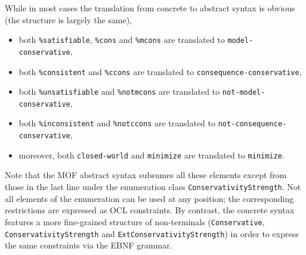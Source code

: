 \documentclass[10pt, a4paper]{isov2}
\newcommand*{\syntax}[1]{\texttt{#1}}
\begin{document}
While in most cases the translation from concrete to abstract syntax
is obvious (the structure is largely the same),  
\begin{itemize}
\item both \syntax{\%satisfiable}, \syntax{\%cons} and \syntax{\%mcons} are translated
  to \syntax{model-conservative},
\item both \syntax{\%consistent}  and \syntax{\%ccons} are translated
  to \syntax{consequence-conservative},
\item  both   \syntax{\%unsatisfiable} and \syntax{\%notmcons} are translated to
  \syntax{not-model-conservative},
\item both \syntax{\%inconsistent}  and \syntax{\%notccons} are translated
  to \syntax{not-consequence-conservative},
\item moreover, both \syntax{closed-world} and \syntax{minimize} are
  translated to \syntax{minimize}.
\end{itemize}
Note that the MOF abstract syntax subsumes all these elements except
from those in the last line under the enumeration class
\syntax{ConservativityStrength}. Not all elements of the enumeration
can be used at any position; the corresponding restrictions are
expressed as OCL constraints.  By contrast, the concrete syntax
features a more fine-grained structure of non-terminals
(\syntax{Conservative}, \syntax{ConservativityStrength} and
\syntax{ExtConservativityStrength}) in order to express the same
constraints via the EBNF grammar.
                       
\end{document}
